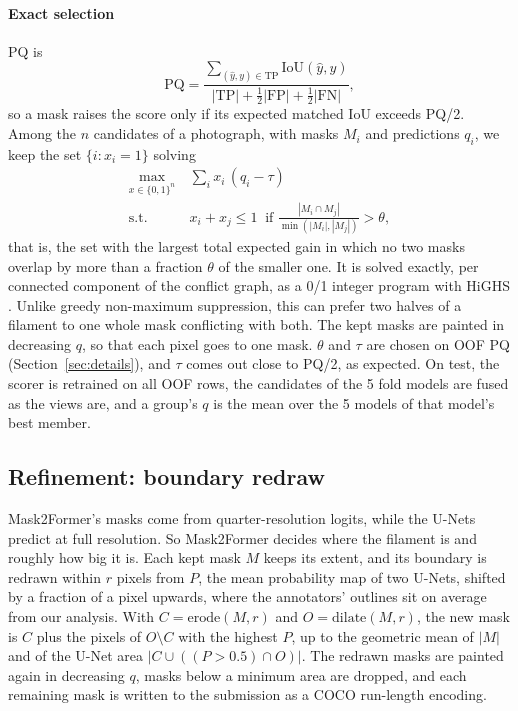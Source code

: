 \documentclass[sigconf]{acmart}
\begin{document}
\paragraph{\textbf{Exact selection}} PQ \cite{kirillov2019panoptic} is
\begin{equation}
  \mathrm{PQ} = \frac{\sum_{(\hat{y}, y) \in \mathrm{TP}} \mathrm{IoU}(\hat{y}, y)}{|\mathrm{TP}| + \tfrac12 |\mathrm{FP}| + \tfrac12 |\mathrm{FN}|},
  \label{eq:pq}
\end{equation}
so a mask raises the score only if its expected matched IoU exceeds PQ/2. Among the $n$ candidates of a photograph, with masks $M_i$ and predictions $q_i$, we keep the set $\{i : x_i = 1\}$ solving
\begin{equation}
  \begin{aligned}
    \max_{x \in \{0,1\}^n}\ & \textstyle\sum_{i} x_i\,(q_i - \tau) \\
    \text{s.t.}\ & x_i + x_j \le 1 \ \text{ if } \frac{|M_i \cap M_j|}{\min(|M_i|, |M_j|)} > \theta,
  \end{aligned}
  \label{eq:select}
\end{equation}
that is, the set with the largest total expected gain in which no two masks overlap by more than a fraction $\theta$ of the smaller one. It is solved exactly, per connected component of the conflict graph, as a 0/1 integer program with HiGHS \cite{huangfu2018highs}. Unlike greedy non-maximum suppression, this can prefer two halves of a filament to one whole mask conflicting with both. The kept masks are painted in decreasing $q$, so that each pixel goes to one mask. $\theta$ and $\tau$ are chosen on OOF PQ (Section~\ref{sec:details}), and $\tau$ comes out close to PQ/2, as expected. On test, the scorer is retrained on all OOF rows, the candidates of the 5 fold models are fused as the views are, and a group's $q$ is the mean over the 5 models of that model's best member.

\subsection{Refinement: boundary redraw}\label{sec:refinement}
Mask2Former's masks come from quarter-resolution logits, while the U-Nets predict at full resolution. So Mask2Former decides where the filament is and roughly how big it is. Each kept mask $M$ keeps its extent, and its boundary is redrawn within $r$ pixels from $P$, the mean probability map of two U-Nets, shifted by a fraction of a pixel upwards, where the annotators' outlines sit on average from our analysis. With $C = \mathrm{erode}(M, r)$ and $O = \mathrm{dilate}(M, r)$, the new mask is $C$ plus the pixels of $O \setminus C$ with the highest $P$, up to the geometric mean of $|M|$ and of the U-Net area $|C \cup ((P > 0.5) \cap O)|$. The redrawn masks are painted again in decreasing $q$, masks below a minimum area are dropped, and each remaining mask is written to the submission as a COCO run-length encoding.
\end{document}

